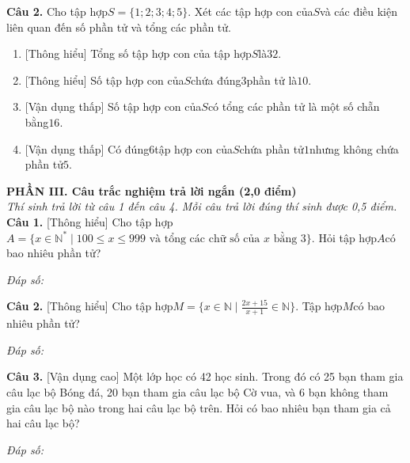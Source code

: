 \documentclass[11pt,a4paper]{article}
\begin{document}
\noindent\textbf{Câu 2.} Cho tập hợp$S = \{1; 2; 3; 4; 5\}$. Xét các tập hợp con của$S$và các điều kiện liên quan đến số phần tử và tổng các phần tử.\par\vspace{2pt}
\begin{enumerate}[label=\textbf{\alph*)}, leftmargin=1.2cm, itemsep=2pt, topsep=2pt]
  \item \textnormal{[Thông hiểu]} Tổng số tập hợp con của tập hợp$S$là$32$.
  \item \textnormal{[Thông hiểu]} Số tập hợp con của$S$chứa đúng$3$phần tử là$10$.
  \item \textnormal{[Vận dụng thấp]} Số tập hợp con của$S$có tổng các phần tử là một số chẵn bằng$16$.
  \item \textnormal{[Vận dụng thấp]} Có đúng$6$tập hợp con của$S$chứa phần tử$1$nhưng không chứa phần tử$5$.
\end{enumerate}
\vspace{6pt}


\vspace{6pt}
\noindent
\textbf{\large PHẦN III. Câu trắc nghiệm trả lời ngắn (2,0 điểm)}\\
\textit{\small Thí sinh trả lời từ câu 1 đến câu 4. Mỗi câu trả lời đúng thí sinh được 0,5 điểm.}
\vspace{6pt}
\noindent\textbf{Câu 1.} [Thông hiểu] Cho tập hợp$A = \{x \in \mathbb{N}^* \mid 100 \le x \le 999 \text{ và tổng các chữ số của } x \text{ bằng } 3\}$. Hỏi tập hợp$A$có bao nhiêu phần tử?\par\vspace{2pt}
\noindent\textit{Đáp số:} \dotfill\par\vspace{6pt}

\noindent\textbf{Câu 2.} [Thông hiểu] Cho tập hợp$M = \{x \in \mathbb{N} \mid \frac{2x + 15}{x + 1} \in \mathbb{N}\}$. Tập hợp$M$có bao nhiêu phần tử?\par\vspace{2pt}
\noindent\textit{Đáp số:} \dotfill\par\vspace{6pt}

\noindent\textbf{Câu 3.} [Vận dụng cao] Một lớp học có 42 học sinh. Trong đó có 25 bạn tham gia câu lạc bộ Bóng đá, 20 bạn tham gia câu lạc bộ Cờ vua, và 6 bạn không tham gia câu lạc bộ nào trong hai câu lạc bộ trên. Hỏi có bao nhiêu bạn tham gia cả hai câu lạc bộ?\par\vspace{2pt}
\noindent\textit{Đáp số:} \dotfill\par\vspace{6pt}
\end{document}
